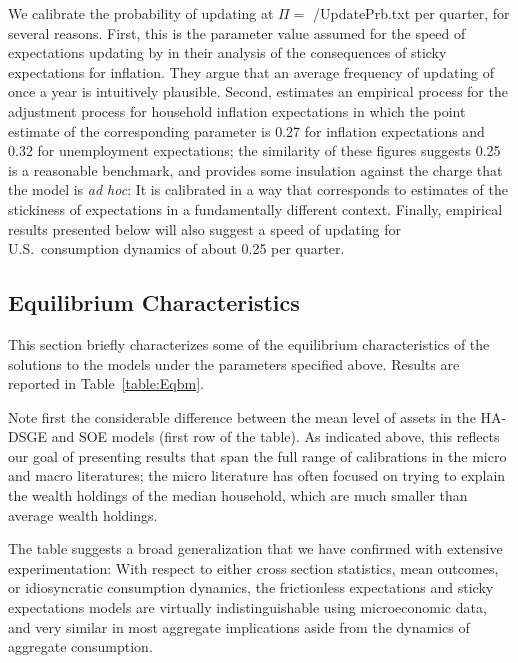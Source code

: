 \documentclass[titlepage]{\econtex}\newcommand{\texname}{cAndCwithStickyE}
\begin{document}
We calibrate the probability of updating at $\Pi=$  {\ParmDir/UpdatePrb.txt} per quarter, for several reasons.  First, this is the parameter value assumed for the speed of expectations updating by \cite{mrSlumps} in their analysis of the consequences of sticky expectations for inflation.  They argue that an average frequency of updating of once a year is intuitively plausible.  Second, \cite{carroll:epidemicinflQJE} estimates an empirical process for the adjustment process for household inflation expectations in which the point estimate of the corresponding parameter is 0.27 for inflation expectations and 0.32 for unemployment expectations; the similarity of these figures suggests 0.25 is a reasonable benchmark, and provides some insulation against the charge that the model is {\it ad hoc}: It is calibrated in a way that corresponds to estimates of the stickiness of expectations in a fundamentally different context.  Finally, empirical results presented below will also suggest a speed of updating for U.S.\ consumption dynamics of about 0.25 per quarter.


\subsection{Equilibrium Characteristics}

This section briefly characterizes some of the equilibrium characteristics of the solutions to the models under the parameters specified above.  Results are reported in Table~\ref{table:Eqbm}.

Note first the considerable difference between the mean level of assets in the HA-DSGE and SOE models (first row of the table).  As indicated above, this reflects our goal of presenting results that span the full range of calibrations in the micro and macro literatures; the micro literature has often focused on trying to explain the wealth holdings of the median household, which are much smaller than average wealth holdings.

The table suggests a broad generalization that we have confirmed with extensive experimentation: With respect to either cross section statistics, mean outcomes, or idiosyncratic consumption dynamics, the frictionless expectations and sticky expectations models are virtually indistinguishable using microeconomic data, and very similar in most aggregate implications aside from the dynamics of aggregate consumption.


\end{document}
